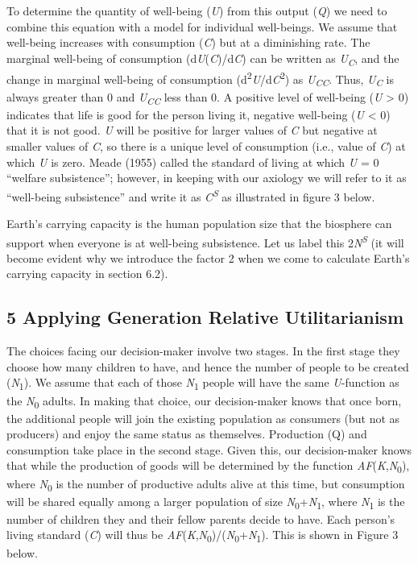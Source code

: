 \documentclass[man,11pt,a4paper,floatsintext]{apa7}
\begin{document}
To determine the quantity of well-being (\textit{U}) from this output (\textit{Q}) we need to combine this equation with a model for individual well-beings. We assume that well-being increases with consumption (\textit{C}) but at a diminishing rate. The marginal well-being of consumption (d\textit{U}(\textit{C})/d\textit{C}) can be written as \textit{U}\textsubscript{\textit{C}}, and the change in marginal well-being of consumption (d\textsuperscript{2}\textit{U}/d\textit{C}\textsuperscript{2}) as \textit{U}\textsubscript{\textit{CC}}. Thus, \textit{U}\textsubscript{\textit{C}} is always greater than 0 and \textit{U}\textsubscript{\textit{CC}} less than 0. A positive level of well-being (\textit{U} \textgreater{} 0) indicates that life is good for the person living it, negative well-being (\textit{U} \textless{} 0) that it is not good. \textit{U} will be positive for larger values of \textit{C} but negative at smaller values of \textit{C}, so there is a unique level of consumption (i.e., value of \textit{C}) at which \textit{U} is zero. Meade (1955) called the standard of living at which \textit{U} = 0 ``welfare subsistence''; however, in keeping with our axiology we will refer to it as ``well-being subsistence'' and write it as \textit{C}\textsuperscript{\textit{S}} as illustrated in figure 3 below.

Earth's carrying capacity is the human population size that the biosphere can support when everyone is at well-being subsistence. Let us label this 2\textit{N}\textsuperscript{\textit{S}} (it will become evident why we introduce the factor 2 when we come to calculate Earth's carrying capacity in section 6.2).

\subsection{5 Applying Generation Relative Utilitarianism}

The choices facing our decision-maker involve two stages. In the first stage they choose how many children to have, and hence the number of people to be created (\textit{N}\textsubscript{1}). We assume that each of those \textit{N}\textsubscript{1} people will have the same \textit{U}-function as the \textit{N}\textsubscript{0} adults. In making that choice, our decision-maker knows that once born, the additional people will join the existing population as consumers (but not as producers) and enjoy the same status as themselves. Production (Q) and consumption take place in the second stage. Given this, our decision-maker knows that while the production of goods will be determined by the function \textit{AF}(\textit{K},\textit{N}\textsubscript{0}), where \textit{N}\textsubscript{0} is the number of productive adults alive at this time, but consumption will be shared equally among a larger population of size \textit{N}\textsubscript{0}+\textit{N}\textsubscript{1}, where \textit{N}\textsubscript{1} is the number of children they and their fellow parents decide to have. Each person's living standard (\textit{C}) will thus be \textit{AF}(\textit{K},\textit{N}\textsubscript{0})/(\textit{N}\textsubscript{0}+\textit{N}\textsubscript{1}). This is shown in Figure 3 below.
\end{document}
